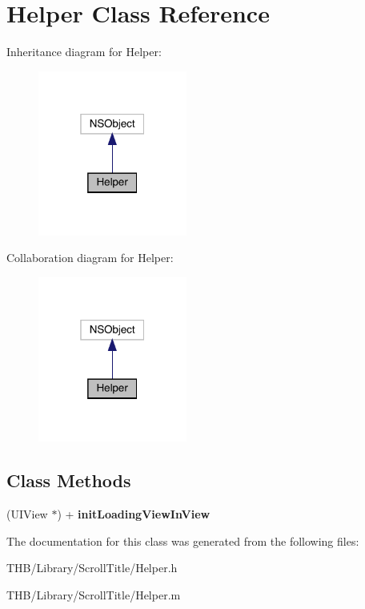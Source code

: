 \hypertarget{interface_helper}{}\section{Helper Class Reference}
\label{interface_helper}


Inheritance diagram for Helper\+:\nopagebreak
\begin{figure}[H]
\begin{center}
\leavevmode
\includegraphics[width=139pt]{interface_helper__inherit__graph}
\end{center}
\end{figure}


Collaboration diagram for Helper\+:\nopagebreak
\begin{figure}[H]
\begin{center}
\leavevmode
\includegraphics[width=139pt]{interface_helper__coll__graph}
\end{center}
\end{figure}
\subsection*{Class Methods}
\begin{DoxyCompactItemize}
\item 
\mbox{\label{interface_helper_ac07cb2affea596649f03efc1bf7cc023}} 
(U\+I\+View $\ast$) + {\bfseries init\+Loading\+View\+In\+View}
\end{DoxyCompactItemize}


The documentation for this class was generated from the following files\+:\begin{DoxyCompactItemize}
\item 
T\+H\+B/\+Library/\+Scroll\+Title/Helper.\+h\item 
T\+H\+B/\+Library/\+Scroll\+Title/Helper.\+m\end{DoxyCompactItemize}
